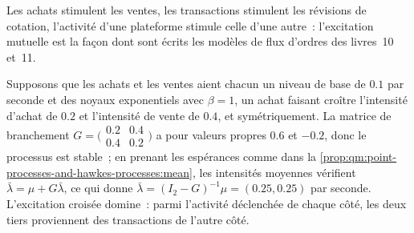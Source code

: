 Les achats stimulent les ventes, les transactions stimulent les révisions de cotation, l'activité d'une plateforme stimule celle d'une autre~: l'excitation mutuelle
est la façon dont sont écrits les modèles de flux d'ordres des livres~10 et~11.

\begin{example}\label{ex:qm:point-processes-and-hawkes-processes:bivariate}
Supposons que les achats et les ventes aient chacun un niveau de base de $0.1$ par seconde et des noyaux exponentiels avec $\beta = 1$, un achat faisant
croître l'intensité d'achat de $0.2$ et l'intensité de vente de $0.4$, et symétriquement. La matrice de branchement $G = \bigl(\begin{smallmatrix}0.2 &
0.4\\0.4 & 0.2\end{smallmatrix}\bigr)$ a pour valeurs propres $0.6$ et $-0.2$, donc le processus est stable~; en prenant les espérances comme dans
la \cref{prop:qm:point-processes-and-hawkes-processes:mean}, les intensités moyennes vérifient $\bar\lambda = \mu + G\bar\lambda$, ce qui donne
$\bar\lambda = (I_2 - G)^{-1}\mu = (0.25, 0.25)$ par seconde. L'excitation croisée domine~: parmi l'activité déclenchée de chaque côté,
les deux tiers proviennent des transactions de l'autre côté.
\end{example}

